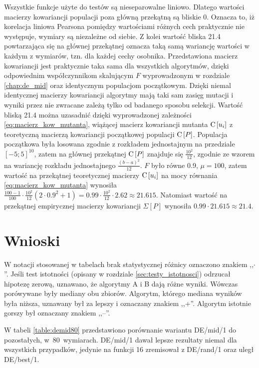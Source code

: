 \documentclass[a4paper,onecolumn,oneside,12pt,wide,floatssmall]{mwrep}
\def\C{{\rm C}\,}
\theoremstyle{definition}
\theoremstyle{plain}%
\theoremstyle{remark}
\begin{document}
Wszystkie funkcje użyte do testów są nieseparowalne liniowo.
Dlatego wartości macierzy kowariancji populacji poza główną przekątną są bliskie 0. Oznacza to,
iż korelacja liniowa Pearsona pomiędzy wartościami różnych cech praktycznie nie występuje, wymiary
są niezależne od siebie. Z kolei wartość bliska 21.4 powtarzająca się na głównej przekątnej 
oznacza taką samą wariancję wartości w każdym z wymiarów, tzn. dla każdej cechy osobnika.
Przedstawiona macierz kowariancji jest praktycznie taka sama dla wszystkich algorytmów, 
dzięki odpowiednim współczynnikom skalującym
$F$ wyprowadzonym w rozdziale \ref{chap:de_mid} oraz identycznym populacjom początkowym. 
Dzięki niemal identycznej macierzy kowariancji algorytmy
mają taki sam zasięg mutacji i wyniki przez nie zwracane zależą tylko od badanego sposobu selekcji.
Wartość bliską 21.4 można uzasadnić dzięki wyprowadzonej zależności \eqref{eq:macierz_kow_mutanta},
wiążącej macierz kowariancji mutanta $\C[u_i]$
z teoretyczną macierzą kowariancji początkowej populacji $\C[P]$. Populacja początkowa była losowana zgodnie z 
rozkładem jednostajnym na przedziale $[-5;5]^{10}$, zatem na głównej przekątnej $\C[P]$
znajduje się $\frac{10^2}{12}$, zgodnie ze wzorem na wariancję rozkładu jednostajnego 
$\frac{(b - a)^2}{12}$. $F$ było równe 0.9, $\mu = 100$, zatem wartość na przekątnej teoretycznej macierzy
$\C[u_i]$ na mocy równania \eqref{eq:macierz_kow_mutanta} wynosiła
$\frac{100 - 1}{100} \cdot \frac{10^2}{12} (2 \cdot 0.9^2 + 1) 
= 0.99 \cdot \frac{10^2}{12}  \cdot 2.62 \approx 21.615$. Natomiast wartość na przekątnej 
empirycznej macierzy kowariancji $\Sigma[P]$
wynosiła $0.99 \cdot 21.615 \approx 21.4$. 

\section{Wnioski}

W notacji stosowanej w tabelach brak statystycznej różnicy oznaczono znakiem ,,$\cdotp$''.
Jeśli test istotności (opisany w rozdziale \ref{sec:testy_istotnosci})
odrzucał hipotezę zerową, uznawano, że algorytmy A i B dają różne wyniki.
Wówczas porówywane były mediany obu zbiorów. Algorytm, którego mediana wyników była niższa,
uznawany był za lepszy i oznaczany znakiem ,,+''. Algorytm istotnie gorszy był oznaczany znakiem ,,--''.

W tabeli \ref{table:demid80} przedstawiono porównanie wariantu DE/mid/1 do pozostałych, w~80~wymiarach.
DE/mid/1 dawał lepsze rezultaty niemal dla wszystkich przypadków, jedynie na funkcji 16 zremisował z DE/rand/1
oraz uległ DE/best/1.
\end{document}
